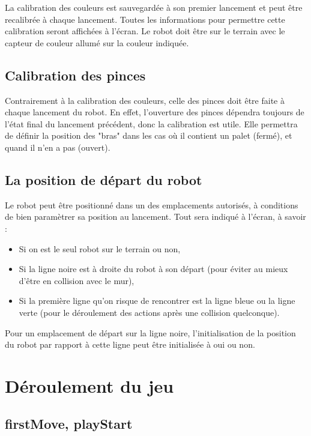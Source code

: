 \documentclass[preprint,12pt]{elsarticle}
\begin{document}
La calibration des couleurs est sauvegardée à son premier lancement et peut être recalibrée à chaque lancement. Toutes les informations pour permettre cette calibration seront affichées à l'écran. Le robot doit être sur le terrain avec le capteur de couleur allumé sur la couleur indiquée.


\subsection{Calibration des pinces}

Contrairement à la calibration des couleurs, celle des pinces doit être faite à chaque lancement du robot. En effet, l'ouverture des pinces dépendra toujours de l'état final du lancement précédent, donc la calibration est utile. Elle permettra de définir la position des "bras" dans les cas où il contient un palet (fermé), et quand il n'en a pas (ouvert).


\subsection{La position de départ du robot}

Le robot peut être positionné dans un des emplacements autorisés, à conditions de bien paramètrer sa position au lancement. 
Tout sera indiqué à l'écran, à savoir : 
\begin{itemize}
\item Si on est le seul robot sur le terrain ou non,
\item Si la ligne noire est à droite du robot à son départ (pour éviter au mieux d'être en collision avec le mur),
\item Si la première ligne qu'on risque de rencontrer est la ligne bleue ou la ligne verte (pour le déroulement des actions après une collision quelconque).
\end{itemize}
Pour un emplacement de départ sur la ligne noire, l'initialisation de la position du robot par rapport à cette ligne peut être initialisée à oui ou non.

\section{Déroulement du jeu}
\label{S:2}

\subsection{firstMove, playStart}
\end{document}
